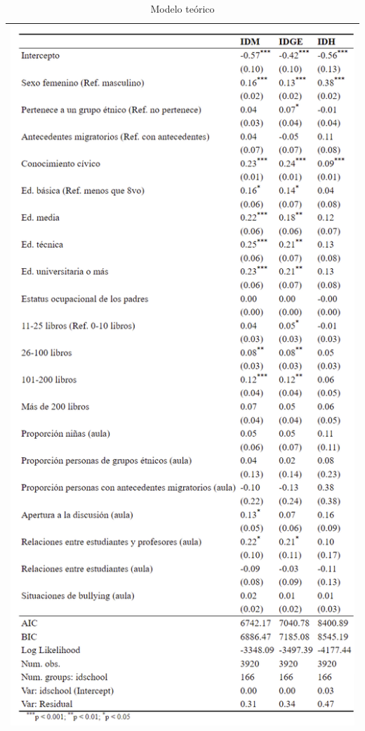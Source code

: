 \documentclass[12pt,twoside]{templates/facsothesis}
\begin{document}
\begin{longtable}[]{@{}l@{}}
\caption{\label{tab:unnamed-chunk-9}Modelo teórico}\tabularnewline
\toprule
\endhead
\includegraphics[width=\textwidth,height=0.9\textheight]{input/images/app_mod.png} \\
\bottomrule
\end{longtable}
\end{document}

